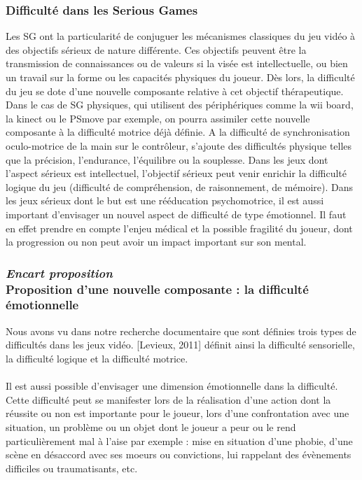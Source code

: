 	\subsubsection{Difficulté dans les Serious Games}
Les SG ont la particularité de conjuguer les mécanismes classiques du jeu vidéo à des objectifs sérieux de nature différente. Ces objectifs peuvent être la transmission de connaissances ou de valeurs si la visée est intellectuelle, ou bien un travail sur la forme ou les capacités physiques du joueur. Dès lors, la difficulté du jeu se dote d’une nouvelle composante relative à cet objectif thérapeutique.\\
Dans le cas de SG physiques, qui utilisent des périphériques comme la wii board, la kinect ou le PSmove par exemple, on pourra assimiler cette nouvelle composante à la difficulté motrice déjà définie. A la difficulté de synchronisation oculo-motrice de la main sur le contrôleur, s’ajoute des difficultés physique telles que la précision, l’endurance, l’équilibre ou la souplesse.
Dans les jeux dont l’aspect sérieux est intellectuel, l’objectif sérieux peut venir enrichir la difficulté logique du jeu (difficulté de compréhension, de raisonnement, de mémoire).
Dans les jeux sérieux dont le but est une rééducation psychomotrice, il est aussi important d’envisager un nouvel aspect de difficulté de type émotionnel. Il faut en effet prendre en compte l’enjeu médical et la possible fragilité du joueur, dont la progression ou non peut avoir un impact important sur son mental.
\newpage
		
\subsubsection{\emph{Encart proposition \\} Proposition d'une nouvelle composante : la difficulté émotionnelle}
Nous avons vu dans notre recherche documentaire que sont définies trois types de difficultés dans les jeux vidéo. [Levieux, 2011]\cite{Levi11} définit ainsi la difficulté sensorielle, la difficulté logique et la difficulté motrice.

\paragraph{}Il est aussi possible d’envisager une dimension émotionnelle dans la difficulté. Cette difficulté peut se manifester lors de la réalisation d’une action dont la réussite ou non est importante pour le joueur, lors d’une confrontation avec une situation, un problème ou un objet dont le joueur a peur ou le rend particulièrement mal à l’aise par exemple : mise en situation d’une phobie, d’une scène en désaccord avec ses moeurs ou convictions, lui rappelant des évènements difficiles ou traumatisants, etc.
